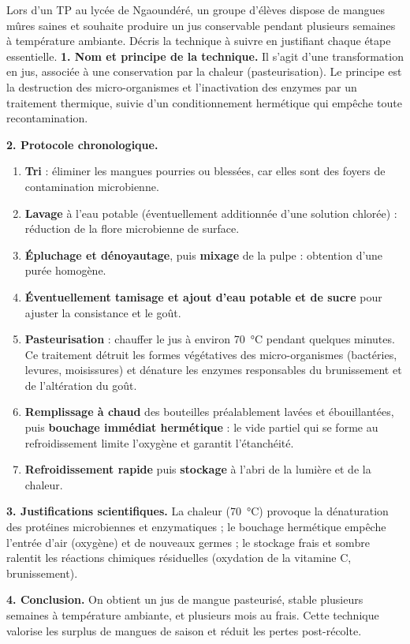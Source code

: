 \documentclass[11pt]{article}
\newcommand{\cle}[1]{{\popxbold\color{popdark}#1}}
\begin{document}
\begin{exoresolu}
Lors d'un TP au lycée de Ngaoundéré, un groupe d'élèves dispose de mangues mûres saines et souhaite produire un jus conservable pendant plusieurs semaines à température ambiante. Décris la technique à suivre en justifiant chaque étape essentielle.
\tcblower
\textbf{1. Nom et principe de la technique.} Il s'agit d'une \cle{transformation} en jus, associée à une \cle{conservation par la chaleur} (pasteurisation). Le principe est la destruction des micro-organismes et l'inactivation des enzymes par un traitement thermique, suivie d'un conditionnement hermétique qui empêche toute recontamination.

\textbf{2. Protocole chronologique.}
\begin{enumerate}
\item \textbf{Tri} : éliminer les mangues pourries ou blessées, car elles sont des foyers de contamination microbienne.
\item \textbf{Lavage} à l'eau potable (éventuellement additionnée d'une solution chlorée) : réduction de la flore microbienne de surface.
\item \textbf{Épluchage et dénoyautage}, puis \textbf{mixage} de la pulpe : obtention d'une purée homogène.
\item \textbf{Éventuellement tamisage et ajout d'eau potable et de sucre} pour ajuster la consistance et le goût.
\item \textbf{Pasteurisation} : chauffer le jus à environ \SI{70}{\celsius} pendant quelques minutes. Ce traitement détruit les formes végétatives des micro-organismes (bactéries, levures, moisissures) et dénature les enzymes responsables du brunissement et de l'altération du goût.
\item \textbf{Remplissage à chaud} des bouteilles préalablement lavées et ébouillantées, puis \textbf{bouchage immédiat hermétique} : le vide partiel qui se forme au refroidissement limite l'oxygène et garantit l'étanchéité.
\item \textbf{Refroidissement rapide} puis \textbf{stockage} à l'abri de la lumière et de la chaleur.
\end{enumerate}

\textbf{3. Justifications scientifiques.} La chaleur (\SI{70}{\celsius}) provoque la dénaturation des protéines microbiennes et enzymatiques ; le bouchage hermétique empêche l'entrée d'air (oxygène) et de nouveaux germes ; le stockage frais et sombre ralentit les réactions chimiques résiduelles (oxydation de la vitamine C, brunissement).

\textbf{4. Conclusion.} On obtient un jus de mangue pasteurisé, stable plusieurs semaines à température ambiante, et plusieurs mois au frais. Cette technique valorise les surplus de mangues de saison et réduit les pertes post-récolte.
\end{exoresolu}
\end{document}
